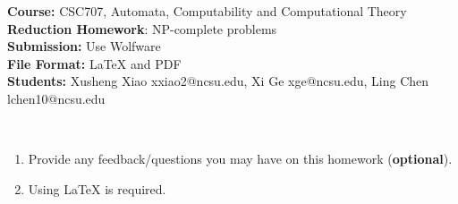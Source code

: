 \documentclass{article}%
\begin{document}
\begin{flushleft}
\textbf{Course:} CSC707, Automata, Computability and Computational Theory\\
\textbf{Reduction Homework}: NP-complete problems \\
\textbf{Submission:} Use Wolfware\\
\textbf{File Format:} LaTeX and PDF\\
\textbf{Students:} Xusheng Xiao xxiao2@ncsu.edu, Xi Ge xge@ncsu.edu, Ling Chen lchen10@ncsu.edu \\
\end{flushleft}

\begin{center}
\\
\begin{enumerate}
	\item Provide any feedback/questions you may have on this homework (\textbf{optional}).
	\item Using LaTeX is required.
\end{enumerate}\end{center}

\noindent{\hrulefill}

\bigskip
\end{document}
